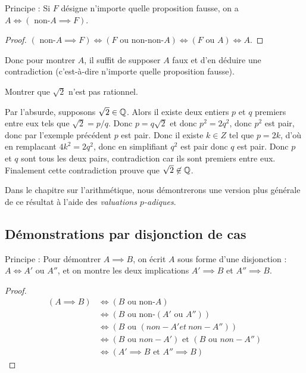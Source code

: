 {Principe : Si $F$ désigne n'importe quelle proposition fausse, on a $A \iff (\text{ non-}A \implies F)$.

\begin{proof}
$(\text{ non-}A \implies F) \iff (F\text{ ou non-non-}A)
\iff (F \text{ ou } A) \iff A$.
\end{proof}

Donc pour montrer $A$, il suffit de supposer $A$ faux et d'en déduire une contradiction (c'est-à-dire n'importe quelle proposition fausse).\\
\begin{exemple}
Montrer que $\sqrt{2}$ n'est pas rationnel.
\begin{red}
Par l'absurde, supposons $\sqrt{2}\in\mathbb{Q}$. Alors il existe deux entiers $p$ et $q$ premiers entre eux tels que $\sqrt{2} = p/q$. Donc $p = q\sqrt{2}$ et donc $p^2 = 2 q^2$, donc $p^2$ est pair, donc par l'exemple précédent $p$ est pair. Donc il existe $k\in Z$ tel que $p = 2k$, d'où en remplacant $4k^2 = 2 q^2$, donc en simplifiant $q^2$ est pair donc $q$ est pair. Donc $p$ et $q$ sont tous les deux pairs, contradiction car ils sont premiers entre eux. Finalement cette contradiction prouve que $\sqrt{2} \not\in \mathbb{Q}$.
\end{red}
\end{exemple}


Dans le chapitre sur l'arithmétique, nous démontrerons une version plus générale de ce résultat à l'aide des \emph{valuations $p$-adiques}.


\subsection{Démonstrations par disjonction de cas}
Principe : Pour démontrer $A\implies B$, on écrit $A$ sous forme d'une disjonction : $A\iff A'\text{ ou }A''$, et on montre les deux implications $A'\implies B$ et $A''\implies B$.

\begin{proof}
\begin{align*}
(A\implies B )
&\iff (B \text{ ou non-}A)\\
&\iff   (B \text{ ou non-}(A' \text{ ou } A''))\\
&\iff (B \text{ ou } (non-A' et \: non-A''))\\
&\iff (B \text{ ou } non-A') \text{ et } (B \text{ ou } non-A'')\\
&\iff (A'\implies B \text{ et } A''\implies B)
\end{align*}
\end{proof}

}
